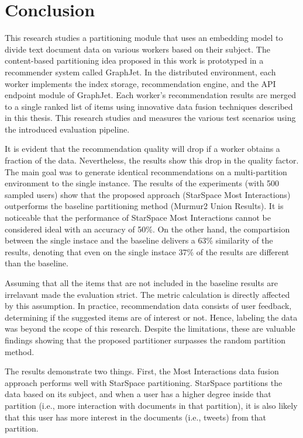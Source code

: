 \chapter{Conclusion}

This research studies a partitioning module that uses an embedding model to divide text document data on various workers based on their subject. The content-based partitioning idea proposed in this work is prototyped in a recommender system called GraphJet. In the distributed environment, each worker implements the index storage, recommendation engine, and the API endpoint module of GraphJet. Each worker's recommendation results are merged to a single ranked list of items using innovative data fusion techniques described in this thesis. This research studies and measures the various test scenarios using the introduced evaluation pipeline.


It is evident that the recommendation quality will drop if a worker obtains a fraction of the data. Nevertheless, the results show this drop in the quality factor. The main goal was to generate identical recommendations on a multi-partition environment to the single instance. The results of the experiments (with 500 sampled users) show that the proposed approach (StarSpace Most Interactions) outperforms the baseline partitioning method (Murmur2 Union Results). It is noticeable that the performance of StarSpace Most Interactions cannot be considered ideal with an accuracy of 50\%. On the other hand, the compartision between the single instace and the baseline delivers a 63\% similarity of the results, denoting that even on the single instace 37\% of the results are different than the baseline.


Assuming that all the items that are not included in the baseline results are irrelavant made the evaluation strict. The metric calculation is directly affected by this assumption. In practice, recommendation data consists of user feedback, determining if the suggested items are of interest or not. Hence, labeling the data was beyond the scope of this research. Despite the limitations, these are valuable findings showing that the proposed partitioner surpasses the random partition method.


The results demonstrate two things. First, the Most Interactions data fusion approach performs well with StarSpace partitioning. StarSpace partitions the data based on its subject, and when a user has a higher degree inside that partition (i.e., more interaction with documents in that partition), it is also likely that this user has more interest in the documents (i.e., tweets) from that partition. 

